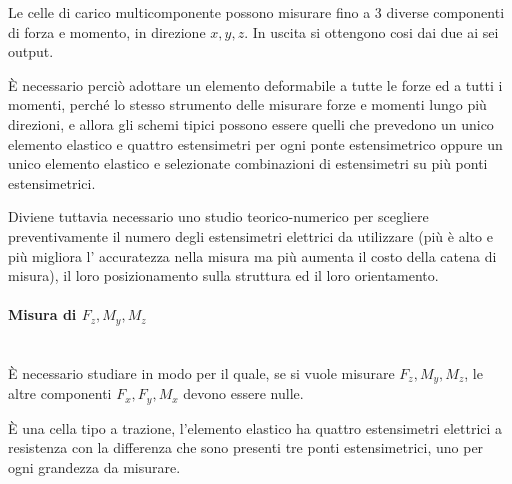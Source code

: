 \documentclass[a4paper, 15pt]{article}
\begin{document}
\begin{adjustwidth}{2in}{}  		
  		Le celle di carico multicomponente possono misurare fino a 3 diverse componenti di forza e momento, in direzione $x, y, z$. In uscita si ottengono cosi dai due ai sei output. \newline 
  		
  		È necessario perciò adottare un elemento deformabile a tutte le forze ed a tutti i momenti, perché lo stesso strumento delle misurare forze e momenti lungo più direzioni, e allora gli schemi tipici possono essere quelli che prevedono un unico elemento elastico e quattro estensimetri per ogni ponte estensimetrico oppure un unico elemento elastico e selezionate combinazioni di estensimetri su più ponti
  		estensimetrici. \newline 
  		
  		Diviene tuttavia necessario uno studio teorico-numerico per scegliere preventivamente il numero degli estensimetri elettrici da utilizzare (più è alto e più migliora l'
  		accuratezza nella misura ma più aumenta il costo
  		della catena di misura), il loro posizionamento sulla struttura ed il loro orientamento. 
  		
\paragraph{Misura di $F_z, M_y, M_z$}\mbox{} \\  
  		È necessario studiare in modo per il quale, se si vuole  misurare $F_z, M_y, M_z$, le altre componenti $F_x, F_y, M_x$ devono essere nulle. \newline 
  		
  		È una cella tipo a trazione, l'elemento elastico ha quattro estensimetri elettrici a resistenza con la differenza che sono presenti tre ponti estensimetrici, uno per ogni grandezza da misurare. \newline


\end{adjustwidth}
\end{document}
